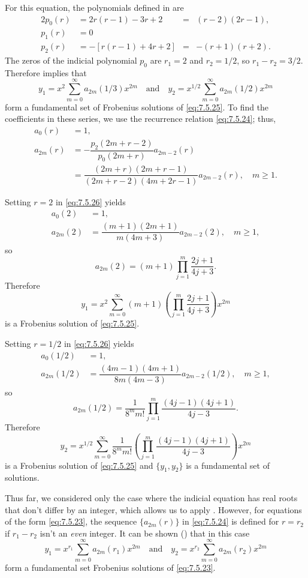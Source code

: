 \begin{solution}
For  this equation,  the polynomials defined in
 are
\begin{alignat*}{2}
p_0(r)&=2r(r-1)-3r+2&=&(r-2)(2r-1),\\
p_1(r)&=0\\
p_2(r)&=-\left[r(r-1)+4r+2\right]&=&-(r+1)(r+2).
\end{alignat*}
The zeros of the indicial polynomial $p_0$ are $r_1=2$
and $r_2=1/2$, so  $r_1-r_2=3/2$. Therefore
 implies that
\[
y_1=x^2\sum_{m=0}^\infty a_{2m}(1/3)x^{2m}\quad\text{and}\quad
y_2=x^{1/2}\sum_{m=0}^\infty a_{2m}(1/2)x^{2m}
\]
form a fundamental set of  Frobenius solutions of \eqref{eq:7.5.25}.
To find the coefficients in these series, we use the recurrence
relation \eqref{eq:7.5.24};   thus,
\begin{equation} \label{eq:7.5.26}
\begin{aligned}
a_0(r)&=1,\\
a_{2m}(r)&=-\dfrac{p_2(2m+r-2)}{p_0(2m+r)}a_{2m-2}(r)\\
&=\dfrac{(2m+r)(2m+r-1)}{(2m+r-2)(4m+2r-1)}a_{2m-2}(r),\quad m\ge1.
\end{aligned}
\end{equation}

Setting $r=2$ in \eqref{eq:7.5.26} yields
\begin{align*}
a_0(2)&=1,\\
a_{2m}(2)&=\dfrac{(m+1)(2m+1)}{m(4m+3)}a_{2m-2}(2),\quad m\ge1,
\end{align*}
so
\[
a_{2m}(2)=(m+1)\prod_{j=1}^m\frac{2j+1}{4j+3}.
\]
Therefore
\[
 y_1=x^2\sum_{m=0}^\infty
(m+1)\left(\prod_{j=1}^m\frac{2j+1}{4j+3}\right)x^{2m}
\]
is a Frobenius solution of \eqref{eq:7.5.25}.

Setting $r=1/2$ in \eqref{eq:7.5.26} yields
\begin{align*}
a_0(1/2)&=1,\\
a_{2m}(1/2)&=\dfrac{(4m-1)(4m+1)}{8m(4m-3)}a_{2m-2}(1/2),\quad
m\ge1,
\end{align*}
so
\[
a_{2m}(1/2)=\frac{1}{8^mm!}\prod_{j=1}^m\frac{(4j-1)(4j+1)}{4j-3}.
\]
Therefore
\[
y_2=x^{1/2}\sum_{m=0}^\infty
\frac{1}{8^mm!}\left(\prod_{j=1}^m\frac{(4j-1)(4j+1)}{4j-3}\right)x^{2m}
\]
is a Frobenius solution of \eqref{eq:7.5.25} and $\{y_1,y_2\}$ is a
fundamental set of solutions.
\end{solution}

\begin{remark*}
Thus far, we considered only the case where the indicial equation
has real roots that don't differ by an integer, which allows us to
apply . However, for equations of the form
\eqref{eq:7.5.23}, the sequence $\{a_{2m}(r)\}$ in \eqref{eq:7.5.24} is
defined for $r=r_2$ if $r_1-r_2$ isn't  an \emph{\color{blue}even} integer. It can be
shown () that in this case
\[
y_1=x^{r_1}\sum_{m=0}^\infty a_{2m}(r_1)x^{2m}\quad\text{and}\quad
y_2=x^{r_2}\sum_{m=0}^\infty a_{2m}(r_2)x^{2m}
\]
form a fundamental set  Frobenius solutions of \eqref{eq:7.5.23}.
\end{remark*}

